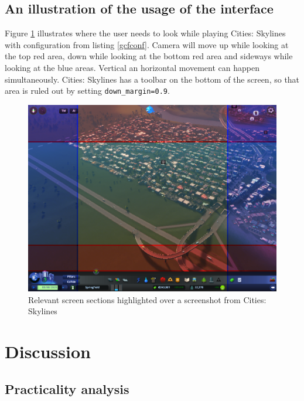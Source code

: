 \documentclass[english]{tktltiki}
\begin{document}
\subsection{An illustration of the usage of the interface}

Figure \ref{citiesskylines} illustrates where the user needs to look while playing Cities: Skylines with configuration from listing \ref{gcfconf}. Camera will move up while looking at the top red area, down while looking at the bottom red area and sideways while looking at the blue areas. Vertical an horizontal movement can happen simultaneously. Cities: Skylines has a toolbar on the bottom of the screen, so that area is ruled out by setting \verb|down_margin=0.9|.

\begin{figure}[h]
\begin{center}
\includegraphics[width=1\textwidth]{cities_skylines.png}
\caption{Relevant screen sections highlighted over a screenshot from Cities: Skylines}
\label{citiesskylines}
\end{center}
\end{figure}



\section{Discussion}

\subsection{Practicality analysis}
\end{document}
